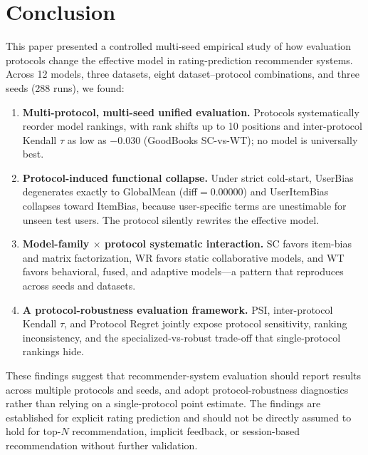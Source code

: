 \documentclass[journal]{IEEEtran}
\begin{document}
\FloatBarrier
\section{Conclusion}
\label{sec:conclusion}

This paper presented a controlled multi-seed empirical study of how evaluation protocols change the effective model in rating-prediction recommender systems. Across 12 models, three datasets, eight dataset--protocol combinations, and three seeds (288 runs), we found:

\begin{enumerate}
    \item \textbf{Multi-protocol, multi-seed unified evaluation.} Protocols systematically reorder model rankings, with rank shifts up to 10 positions and inter-protocol Kendall $\tau$ as low as $-0.030$ (GoodBooks SC-vs-WT); no model is universally best.
    \item \textbf{Protocol-induced functional collapse.} Under strict cold-start, UserBias degenerates exactly to GlobalMean (diff$=$0.00000) and UserItemBias collapses toward ItemBias, because user-specific terms are unestimable for unseen test users. The protocol silently rewrites the effective model.
    \item \textbf{Model-family $\times$ protocol systematic interaction.} SC favors item-bias and matrix factorization, WR favors static collaborative models, and WT favors behavioral, fused, and adaptive models---a pattern that reproduces across seeds and datasets.
    \item \textbf{A protocol-robustness evaluation framework.} PSI, inter-protocol Kendall $\tau$, and Protocol Regret jointly expose protocol sensitivity, ranking inconsistency, and the specialized-vs-robust trade-off that single-protocol rankings hide.
\end{enumerate}

These findings suggest that recommender-system evaluation should report results across multiple protocols and seeds, and adopt protocol-robustness diagnostics rather than relying on a single-protocol point estimate. The findings are established for explicit rating prediction and should not be directly assumed to hold for top-$N$ recommendation, implicit feedback, or session-based recommendation without further validation.
\end{document}
